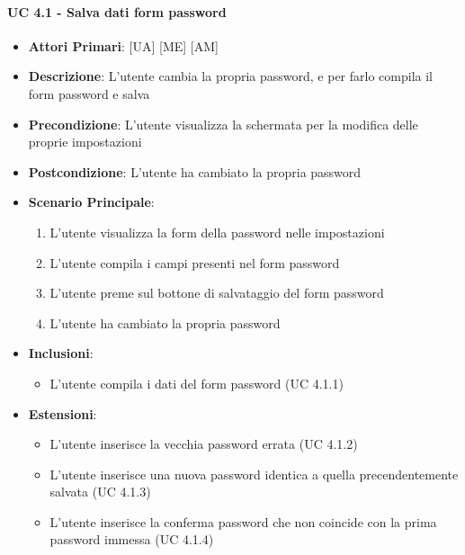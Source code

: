 			\paragraph{UC 4.1 - Salva dati form password}
			\begin{itemize}
				\item \textbf{Attori Primari}: [UA] [ME] [AM]
				\item \textbf{Descrizione}: L'utente cambia la propria password, e per farlo compila il form password e salva
				\item \textbf{Precondizione}: L'utente visualizza la schermata per la modifica delle proprie impostazioni
				\item \textbf{Postcondizione}: L'utente ha cambiato la propria password
				\item \textbf{Scenario Principale}:
				\begin{enumerate}
					\item{L'utente visualizza la form della password nelle impostazioni}
					\item{L'utente compila i campi presenti nel form password}
					\item{L'utente preme sul bottone di salvataggio del form password}
					\item{L'utente ha cambiato la propria password}
				\end{enumerate}	
				\item \textbf{Inclusioni}:
					\begin{itemize}
						\item L'utente compila i dati del form password (UC 4.1.1)
					\end{itemize}
				\item \textbf{Estensioni}:
					\begin{itemize}
						\item L'utente inserisce la vecchia password errata (UC 4.1.2)
						\item L'utente inserisce una nuova password identica a quella precendentemente salvata (UC 4.1.3)
						\item L'utente inserisce la conferma password che non coincide con la prima password immessa (UC 4.1.4)
					\end{itemize}
			\end{itemize}

